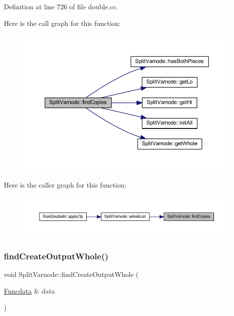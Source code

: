 Definition at line 726 of file double.\+cc.

Here is the call graph for this function\+:
\nopagebreak
\begin{figure}[H]
\begin{center}
\leavevmode
\includegraphics[width=350pt]{class_split_varnode_a565abf157db41c402ce92a365f51e600_cgraph}
\end{center}
\end{figure}
Here is the caller graph for this function\+:
\nopagebreak
\begin{figure}[H]
\begin{center}
\leavevmode
\includegraphics[width=350pt]{class_split_varnode_a565abf157db41c402ce92a365f51e600_icgraph}
\end{center}
\end{figure}
\mbox{\label{class_split_varnode_a6b3c7a86293983e897c0da90f46d1499}} 
\subsubsection{\texorpdfstring{findCreateOutputWhole()}{findCreateOutputWhole()}}
{\footnotesize\ttfamily void Split\+Varnode\+::find\+Create\+Output\+Whole (\begin{DoxyParamCaption}\item[{\mbox{\hyperlink{class_funcdata}{Funcdata}} \&}]{data }\end{DoxyParamCaption})}



